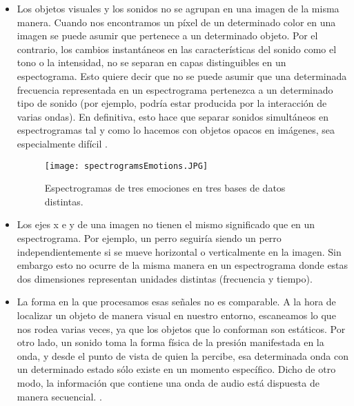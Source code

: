 \documentclass[11pt,a4paper,spanish]{book}
\begin{document}
	\begin{itemize}
		\item Los objetos visuales y los sonidos no se agrupan en una imagen de la misma manera. Cuando nos encontramos un píxel de un determinado color en una imagen se puede asumir que pertenece a un determinado objeto. Por el contrario, los cambios instantáneos en las características del sonido como el tono o la intensidad, no se separan en capas distinguibles en un espectograma. Esto quiere decir que no se puede asumir que una determinada frecuencia representada en un espectrograma pertenezca a un determinado tipo de sonido (por ejemplo, podría estar producida por la interacción de varias ondas). En definitiva, esto hace que separar sonidos simultáneos en espectrogramas tal y como lo hacemos con objetos opacos en imágenes, sea especialmente difícil \cite{Wyse2017}. %
		
		\begin{figure}[H]
			\centering
			\texttt{[image: spectrogramsEmotions.JPG]} 
			\caption{Espectrogramas de tres emociones en tres bases de datos distintas.}
			\label{fig:spectroEmo}
		\end{figure}
		
		\item Los ejes x e y de una imagen no tienen el mismo significado que en un espectrograma. Por ejemplo, un perro seguiría siendo un perro independientemente si se mueve horizontal o verticalmente en la imagen. Sin embargo esto no ocurre de la misma manera en un espectrograma donde estas dos dimensiones representan unidades distintas (frecuencia y tiempo)\cite{spectrograms2021}.
		
		\item La forma en la que procesamos esas señales no es comparable. A la hora de localizar un objeto de manera visual en nuestro entorno, escaneamos lo que nos rodea varias veces, ya que los objetos que lo conforman son estáticos. 
		Por otro lado, un sonido toma la forma física de la presión manifestada en la onda, y desde el punto de vista de quien la percibe, esa determinada onda con un determinado estado sólo existe en un momento específico. Dicho de otro modo, la información que contiene una onda de audio está dispuesta de manera secuencial.
		\cite{JHui2019}.
		
	\end{itemize} 
	

	
	
	
	
	
	
	
	\printbibliography
	
\end{document}
